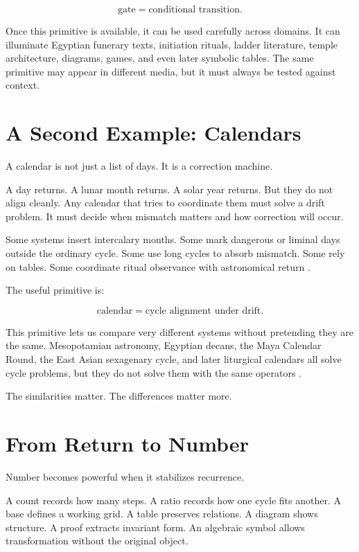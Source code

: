 \documentclass[11pt]{book}
\begin{document}
\[
\text{gate} = \text{conditional transition}.
\]

Once this primitive is available, it can be used carefully across domains. It can illuminate Egyptian funerary texts, initiation rituals, ladder literature, temple architecture, diagrams, games, and even later symbolic tables. The same primitive may appear in different media, but it must always be tested against context.

\section{A Second Example: Calendars}

A calendar is not just a list of days. It is a correction machine.

A day returns. A lunar month returns. A solar year returns. But they do not align cleanly. Any calendar that tries to coordinate them must solve a drift problem. It must decide when mismatch matters and how correction will occur.

Some systems insert intercalary months. Some mark dangerous or liminal days outside the ordinary cycle. Some use long cycles to absorb mismatch. Some rely on tables. Some coordinate ritual observance with astronomical return \cite{Neugebauer1957ExactSciences,Aveni1989EmpiresTime,BrickerBricker2011AstronomyMayaCodices,Needham1959ScienceCivilisationChina3}.

The useful primitive is:

\[
\text{calendar} = \text{cycle alignment under drift}.
\]

This primitive lets us compare very different systems without pretending they are the same. Mesopotamian astronomy, Egyptian decans, the Maya Calendar Round, the East Asian sexagenary cycle, and later liturgical calendars all solve cycle problems, but they do not solve them with the same operators \cite{HungerPingree1999AstralSciences,NeugebauerParker1960EAT1,NeugebauerParker1964EAT2,BrickerBricker2011AstronomyMayaCodices,Needham1959ScienceCivilisationChina3}.

The similarities matter. The differences matter more.

\section{From Return to Number}

Number becomes powerful when it stabilizes recurrence.

A count records how many steps. A ratio records how one cycle fits another. A base defines a working grid. A table preserves relations. A diagram shows structure. A proof extracts invariant form. An algebraic symbol allows transformation without the original object.
\end{document}
